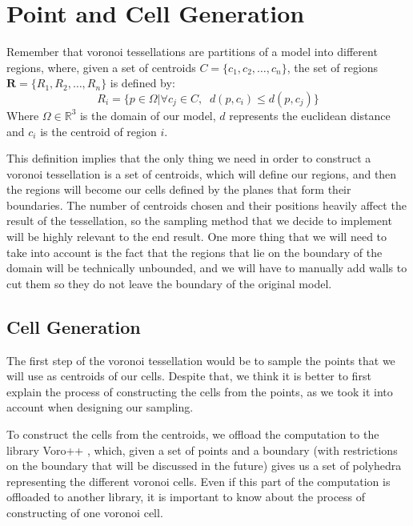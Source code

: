\section{Point and Cell Generation}
Remember that voronoi tessellations are partitions of a model into 
different regions, where, given a set of centroids $C = \{c_1, c_2, \hdots , c_n\}$,
the set of regions $\mathbf{R} = \{R_1, R_2, \hdots, R_n\}$ is defined by: 
\begin{equation}
R_i = \{p \in \Omega | \forall c_j \in C, \; \;  d(p, c_i) \leq d(p, c_j)\}
\end{equation}
Where $\Omega \in \mathbb{R}^3$ is the domain of our model, $d$ represents 
the euclidean distance and $c_i$ is the centroid of region $i$.

\vspace{10pt}

This definition implies that the only thing we need in order to construct a 
voronoi tessellation is a set of centroids, which will define our regions, and then the 
regions will become our cells defined by the planes that form their boundaries. 
The number of centroids chosen and their positions heavily affect the result
of the tessellation, so the sampling method that we decide to implement will be 
highly relevant to the end result. One more
thing that we will need to take into account is the fact that the regions
that lie on the boundary of the domain will be technically unbounded, and 
we will have to manually add walls to cut them so they do not leave the 
boundary of the original model.
 
\subsection{Cell Generation} \label{sec:cellGen}

The first step of the voronoi tessellation would be to sample the points 
that we will use as centroids of our cells. Despite that, we think it is 
better to first explain the process of constructing the cells from the 
points, as we took it into account when designing our sampling.

\vspace{10pt}

To construct the cells from the centroids, we offload the computation
to the library Voro++ \cite{osti_code-54674}, which, given a set of points 
and a boundary (with restrictions on the boundary that will be discussed 
in the future) gives us a set of polyhedra representing the different voronoi 
cells. Even if this part of the computation is offloaded to another library, 
it is important to know about the process of constructing of one voronoi cell.

